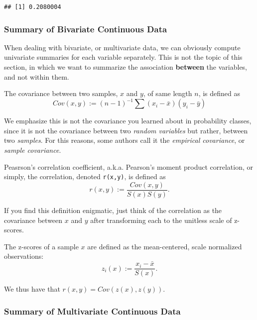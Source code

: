 \documentclass[]{book}
\theoremstyle{definition}
\theoremstyle{definition}
\theoremstyle{definition}
\theoremstyle{remark}
\let\BeginKnitrBlock\begin \let\EndKnitrBlock\end
\begin{document}
\begin{verbatim}
## [1] 0.2080004
\end{verbatim}

\subsubsection{Summary of Bivariate Continuous
Data}\label{summary-of-bivariate-continuous-data}

When dealing with bivariate, or multivariate data, we can obviously
compute univariate summaries for each variable separately. This is not
the topic of this section, in which we want to summarize the association
\textbf{between} the variables, and not within them.

\BeginKnitrBlock{definition}[Covariance]
\protect\hypertarget{def:unnamed-chunk-80}{}{\label{def:unnamed-chunk-80}
{} }The covariance between two samples, \(x\)
and \(y\), of same length \(n\), is defined as
\[Cov(x,y):= (n-1)^{-1} \sum (x_i-\bar x)(y_i-\bar y)  \]
\EndKnitrBlock{definition}

We emphasize this is not the covariance you learned about in probability
classes, since it is not the covariance between two \emph{random
variables} but rather, between two \emph{samples}. For this reasons,
some authors call it the \emph{empirical covariance}, or \emph{sample
covariance}.

\BeginKnitrBlock{definition}[Pearson's Correlation Coefficient]
\protect\hypertarget{def:unnamed-chunk-81}{}{\label{def:unnamed-chunk-81}
{} }Peasrson's
correlation coefficient, a.k.a. Pearson's moment product correlation, or
simply, the correlation, denoted \texttt{r(x,y)}, is defined as
\[r(x,y):=\frac{Cov(x,y)}{S(x)S(y)}. \]
\EndKnitrBlock{definition}

If you find this definition enigmatic, just think of the correlation as
the covariance between \(x\) and \(y\) after transforming each to the
unitless scale of z-scores.

\BeginKnitrBlock{definition}[Z-Score]
\protect\hypertarget{def:unnamed-chunk-82}{}{\label{def:unnamed-chunk-82}
{} }The z-scores of a sample \(x\) are defined as
the mean-centered, scale normalized observations:
\[z_i(x):= \frac{x_i-\bar x}{S(x)}.\]
\EndKnitrBlock{definition}

We thus have that \(r(x,y)=Cov(z(x),z(y))\).

\subsubsection{Summary of Multivariate Continuous
Data}\label{summary-of-multivariate-continuous-data}
\end{document}
